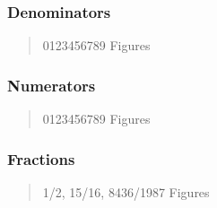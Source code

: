\subsubsection{Denominators}
\begin{quote}
{ 0123456789 Figures}
\end{quote}

\subsubsection{Numerators}
\begin{quote}
{ 0123456789 Figures}
\end{quote}

\subsubsection{Fractions}
\begin{quote}
{ 1/2, 15/16, 8436/1987 Figures}
\end{quote}